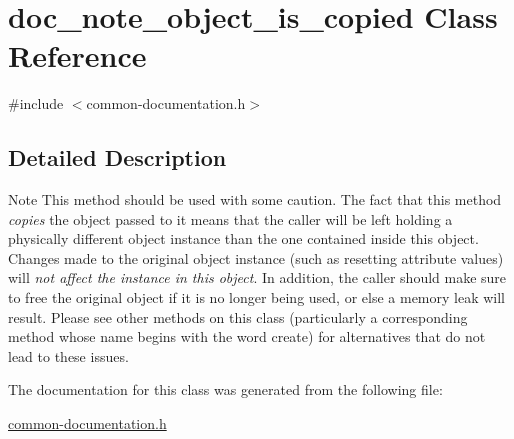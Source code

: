\hypertarget{classdoc__note__object__is__copied}{}\section{doc\+\_\+note\+\_\+object\+\_\+is\+\_\+copied Class Reference}
\label{classdoc__note__object__is__copied}


{\ttfamily \#include $<$common-\/documentation.\+h$>$}



\subsection{Detailed Description}
\begin{DoxyNote}{Note}
This method should be used with some caution. The fact that this method {\itshape copies} the object passed to it means that the caller will be left holding a physically different object instance than the one contained inside this object. Changes made to the original object instance (such as resetting attribute values) will {\itshape not affect the instance in this object}. In addition, the caller should make sure to free the original object if it is no longer being used, or else a memory leak will result. Please see other methods on this class (particularly a corresponding method whose name begins with the word {\ttfamily create}) for alternatives that do not lead to these issues. 
\end{DoxyNote}


The documentation for this class was generated from the following file\+:\begin{DoxyCompactItemize}
\item 
\hyperlink{common-documentation_8h}{common-\/documentation.\+h}\end{DoxyCompactItemize}
